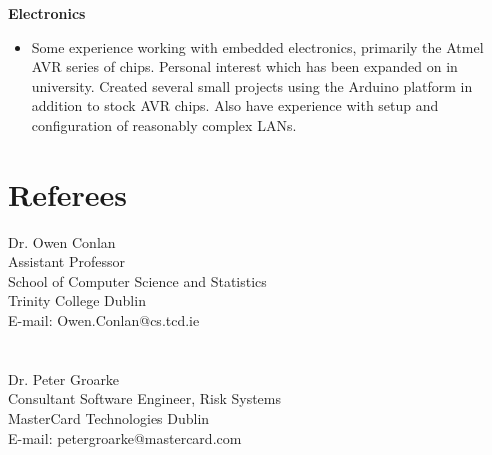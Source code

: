 \documentclass{res}
\begin{document}
\begin{resume}
   {\bf  Electronics} 
        \begin{itemize}
        \item[]  Some experience working with embedded electronics, primarily the Atmel AVR series of chips. Personal interest which has been expanded on in university. Created several small projects using the Arduino platform in addition to stock AVR chips. Also have experience with setup and configuration of reasonably complex LANs.
       \end{itemize} 

 
\section{Referees}
\vspace{0.1in} 
 
   Dr. Owen Conlan\\
   Assistant Professor\\
   School of Computer Science and Statistics\\
   Trinity College Dublin\\
   E-mail: Owen.Conlan@cs.tcd.ie\\
   \\
   \\
   Dr. Peter Groarke\\
   Consultant Software Engineer, Risk Systems\\
   MasterCard Technologies Dublin\\
   E-mail: peter\textunderscore groarke@mastercard.com\\
  



    
 

\end{resume}
\end{document}
